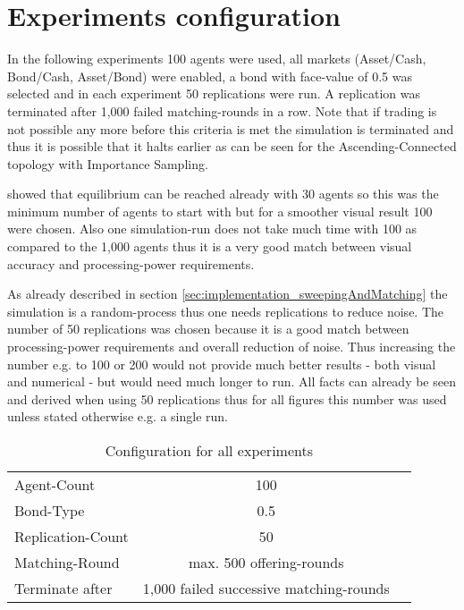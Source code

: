 \documentclass[Bachelorarbeit.tex]{subfiles}
\begin{document}
\section{Experiments configuration}
In the following experiments 100 agents were used, all markets (Asset/Cash, Bond/Cash, Asset/Bond) were enabled, a bond with face-value of 0.5 was selected and in each experiment 50 replications were run. A replication was terminated after 1,000 failed matching-rounds in a row. Note that if trading is not possible any more before this criteria is met the simulation is terminated and thus it is possible that it halts earlier as can be seen for the Ascending-Connected topology with Importance Sampling.

\bigskip 

\cite{Breuer2015} showed that equilibrium can be reached already with 30 agents so this was the minimum number of agents to start with but for a smoother visual result 100 were chosen. Also one simulation-run does not take much time with 100 as compared to the 1,000 agents thus it is a very good match between visual accuracy and processing-power requirements.

\medskip

As already described in section \ref{sec:implementation_sweepingAndMatching} the simulation is a random-process thus one needs replications to reduce noise. The number of 50 replications was chosen because it is a good match between processing-power requirements and overall reduction of noise. Thus increasing the number e.g. to 100 or 200 would not provide much better results - both visual and numerical - but would need much longer to run. All facts can already be seen and derived when using 50 replications thus for all figures this number was used unless stated otherwise e.g. a single run.

\begin{table}[H]
	\centering
	\caption{Configuration for all experiments}
	\begin{tabular} { l c r }
		\hline
		Agent-Count & 100 \\
		Bond-Type & 0.5 \\
		Replication-Count & 50 \\
		Matching-Round & max. 500 offering-rounds \\
		Terminate after & 1,000 failed successive matching-rounds \\
		\hline
	\end{tabular}
\end{table}
\end{document}
